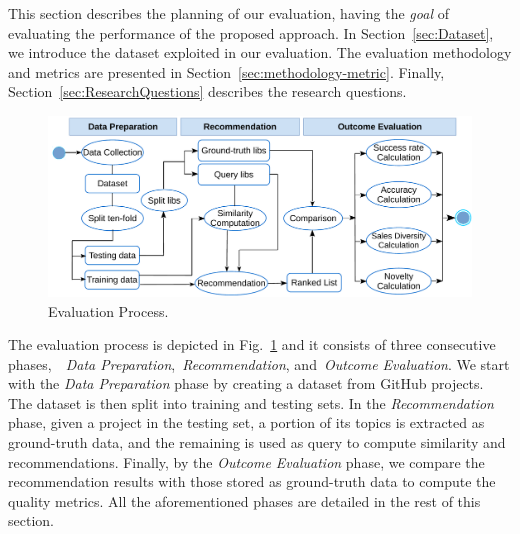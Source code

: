 





This section describes the planning of our evaluation, having the {\em goal} of evaluating the performance of the proposed approach. In Section~\ref{sec:Dataset}, we introduce the dataset exploited in our evaluation. The evaluation methodology and metrics are presented in Section~\ref{sec:methodology-metric}. Finally, Section~\ref{sec:ResearchQuestions} describes the research questions.



\begin{figure}[h!]
	\centering
	\includegraphics[width=\linewidth]{figs/EvaluationProcess.pdf}
	\caption{Evaluation Process.}
	\label{fig:EvaluationProcess}
	\vspace{-.3cm}
\end{figure}

The evaluation process is depicted in Fig.~\ref{fig:EvaluationProcess} and it consists of three consecutive phases,~\ie~\emph{Data Preparation},~\emph{Recommendation}, and~\emph{Outcome Evaluation}. We start with the \emph{Data Preparation} phase by creating a dataset from  GitHub projects. %
The dataset is then split into training and testing sets.  In the \emph{Recommendation} phase, given a project in the testing set, a portion of its topics is extracted as ground-truth data, and the remaining is used as query to compute similarity and recommendations. Finally, by the \emph{Outcome Evaluation} phase, we compare the recommendation results with those stored as ground-truth data to compute the quality metrics. All the aforementioned phases are  detailed in the rest of this section.


